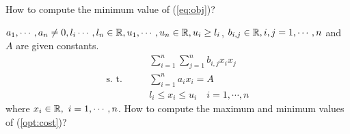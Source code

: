 \documentclass{llncs}
\begin{document}
\begin{problem}
	How to compute the minimum value of (\ref{eq:obj})?
\end{problem}
\begin{problem}
	  $a_1,\cdots,a_n\neq 0,l_i\cdots,l_n\in \mathbb{R}, u_1,\cdots,u_n\in \mathbb{R}, u_i\ge l_i$,  $b_{i,j}\in \mathbb{R}, i,j=1,\cdots, n$ and $A$ are given constants. 
	\begin{align}
	&\sum_{i=1}^n\sum_{j=1}^nb_{i,j}x_{i}x_{j}  \label{opt:cost}\\
	\mbox{s.\ t.}\qquad	&\sum_{i=1}^na_ix_i=A \nonumber\\
	&l_i\le x_i\le u_i\quad i=1,\cdots,n \nonumber
	\end{align}
	where $x_i\in \mathbb{R},\ i =1,\cdots, n$.
How to compute the maximum and minimum values of (\ref{opt:cost})?
\end{problem}
	
\end{document}
